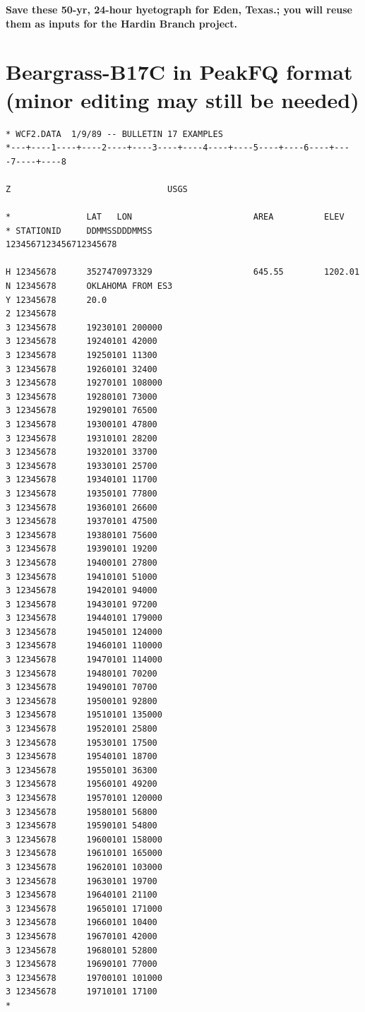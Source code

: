 \documentclass[12pt]{article}
\begin{document}
\textbf{Save these 50-yr, 24-hour hyetograph for Eden, Texas.; you will reuse them as inputs for the Hardin Branch project.}

\clearpage

\section*{\small{Beargrass-B17C in PeakFQ format (minor editing may still be needed)}}
\begin{verbatim}
* WCF2.DATA  1/9/89 -- BULLETIN 17 EXAMPLES
*---+----1----+----2----+----3----+----4----+----5----+----6----+----7----+----8

Z                               USGS

*               LAT   LON                        AREA          ELEV
* STATIONID     DDMMSSDDDMMSS                    1234567123456712345678

H 12345678      3527470973329                    645.55        1202.01
N 12345678      OKLAHOMA FROM ES3
Y 12345678      20.0
2 12345678
3 12345678      19230101 200000
3 12345678      19240101 42000
3 12345678      19250101 11300
3 12345678      19260101 32400
3 12345678      19270101 108000
3 12345678      19280101 73000
3 12345678      19290101 76500
3 12345678      19300101 47800
3 12345678      19310101 28200
3 12345678      19320101 33700
3 12345678      19330101 25700
3 12345678      19340101 11700
3 12345678      19350101 77800
3 12345678      19360101 26600
3 12345678      19370101 47500
3 12345678      19380101 75600
3 12345678      19390101 19200
3 12345678      19400101 27800
3 12345678      19410101 51000
3 12345678      19420101 94000
3 12345678      19430101 97200
3 12345678      19440101 179000
3 12345678      19450101 124000
3 12345678      19460101 110000
3 12345678      19470101 114000
3 12345678      19480101 70200
3 12345678      19490101 70700
3 12345678      19500101 92800
3 12345678      19510101 135000
3 12345678      19520101 25800
3 12345678      19530101 17500
3 12345678      19540101 18700
3 12345678      19550101 36300
3 12345678      19560101 49200
3 12345678      19570101 120000
3 12345678      19580101 56800
3 12345678      19590101 54800
3 12345678      19600101 158000
3 12345678      19610101 165000
3 12345678      19620101 103000
3 12345678      19630101 19700
3 12345678      19640101 21100
3 12345678      19650101 171000
3 12345678      19660101 10400
3 12345678      19670101 42000
3 12345678      19680101 52800
3 12345678      19690101 77000
3 12345678      19700101 101000
3 12345678      19710101 17100         
*

\end{verbatim}
\end{document}
